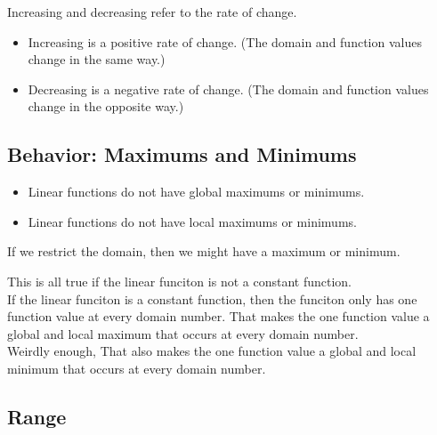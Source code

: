 \documentclass{ximera}
\begin{document}
Increasing and decreasing refer to the rate of change.


\begin{itemize}
\item Increasing is a positive rate of change. (The domain and function values change in the same way.)
\item Decreasing is a negative rate of change. (The domain and function values change in the opposite way.)
\end{itemize}
















\subsection*{Behavior: Maximums and Minimums}


\begin{itemize}
     \item Linear functions do not have global maximums or minimums. 
     \item Linear functions do not have local maximums or minimums. 
\end{itemize}


If we restrict the domain, then we might have a maximum or minimum. \\



\begin{warning}

This is all true if the linear funciton is not a constant function. \\


If the linear funciton is a constant function, then the funciton only has one function value at every domain number.  That makes the one function value a global and local maximum that occurs at every domain number. \\

Weirdly enough, That also makes the one function value a global and local minimum that occurs at every domain number.

\end{warning}



\subsection*{Range}
\end{document}
